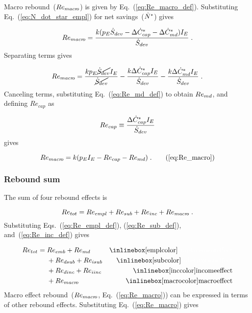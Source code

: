 Macro rebound~($Re_{macr\!o}$) is given by Eq.~(\ref{eq:Re_macro_def}).
Substituting Eq.~(\ref{eq:N_dot_star_empl}) for net savings~(${\dot{N}}^*$) gives

\begin{equation}
  Re_{macr\!o} = \frac{k (p_E \dot{S}_{dev} - \Delta {\dot{C}}^*_{cap} - \Delta {\dot{C}}^*_{md}) I_E}{\dot{S}_{dev}} \; .
\end{equation}
%
Separating terms gives

\begin{equation}
  Re_{macr\!o} = \frac{k p_E \cancel{\dot{S}_{dev}} I_E}{\cancel{\dot{S}_{dev}}}
                                - \frac{k \Delta {\dot{C}}^*_{cap} I_E}{\dot{S}_{dev}}
                                - \frac{k \Delta {\dot{C}}^*_{md} I_E}{\dot{S}_{dev}} \; .
\end{equation}
%
Canceling terms, substituting Eq.~(\ref{eq:Re_md_def}) to obtain $Re_{md}$, and
defining $Re_{cap}$ as

\begin{equation} \label{eq:Re_cap}
  Re_{cap} \equiv \frac{\Delta {\dot{C}}^*_{cap} I_E}{\dot{S}_{dev}}{}
\end{equation}
%
gives

\begin{equation}
  Re_{\macro} = \Remacroeqn{} \; . \tag{\ref{eq:Re_macro}}
\end{equation}


\subsubsection{Rebound sum} 
\label{sec:total_rebound}

The sum of four rebound effects is 

\begin{equation}
  Re_{tot} = Re_{empl} + Re_{sub} + Re_{inc} + Re_{macr\!o} \; .
\end{equation}
%
Substituting Eqs.~(\ref{eq:Re_empl_def}), (\ref{eq:Re_sub_def}), and~(\ref{eq:Re_inc_def}) gives

\begin{align}
  Re_{tot} = \; &Re_{emb} + Re_{\md}      & \mathrm{\empleffect} \nonumber \\
                &+ Re_{dsub} + Re_{isub}   & \mathrm{\subeffect}  \nonumber \\
                &+ Re_{dinc} + Re_{iinc}   & \mathrm{\inceffect}  \nonumber \\
                &+ Re_{\macro}      & \mathrm{\macroeffect}
\end{align}
%
Macro effect rebound~($Re_{macr\!o}$, Eq.~(\ref{eq:Re_macro}))
can be expressed in terms of other rebound effects.
Substituting Eq.~(\ref{eq:Re_macro}) gives

